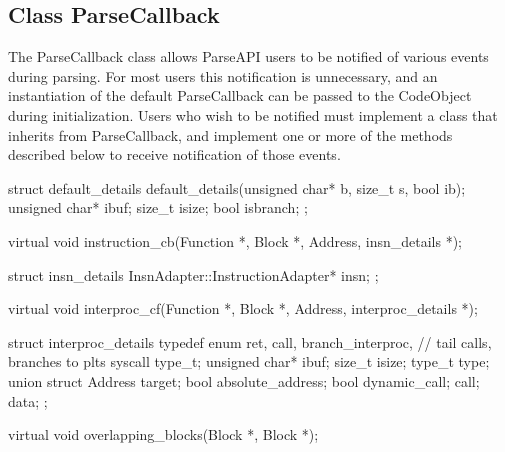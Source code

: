 \subsection{Class ParseCallback}


The ParseCallback class allows ParseAPI users to be notified of various events
during parsing. For most users this notification is unnecessary, and an
instantiation of the default ParseCallback can be passed to the CodeObject during initialization. Users who wish to be notified must implement a class that inherits from ParseCallback, and implement one or more of the methods described below to receive notification of those events.

\begin{apient}
struct default_details {
    default_details(unsigned char* b, size_t s, bool ib);
    unsigned char* ibuf;
    size_t isize;
    bool isbranch;
};
\end{apient}

\begin{apient}
virtual void instruction_cb(Function *,
                            Block *,
                            Address,
                            insn_details *);
\end{apient}

\begin{apient}
struct insn_details {
    InsnAdapter::InstructionAdapter* insn;
};
\end{apient}

\begin{apient}
virtual void interproc_cf(Function *,
                          Block *,
                          Address,
                          interproc_details *);
\end{apient}

\begin{apient}
struct interproc_details {
    typedef enum {
        ret,
        call,
        branch_interproc, // tail calls, branches to plts
        syscall
    } type_t;
    unsigned char* ibuf;
    size_t isize;
    type_t type;
    union {
        struct {
            Address target;
            bool absolute_address;
            bool dynamic_call;
        } call;
    } data;
};
\end{apient}

\begin{apient}
virtual void overlapping_blocks(Block *,
                                Block *);
\end{apient}

